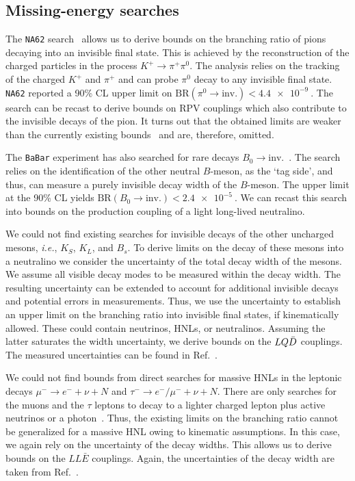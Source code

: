 \medskip


\medskip

\subsection{Missing-energy searches}

The \texttt{NA62} search~\cite{NA62:2020pwi} allows us to derive bounds on the branching ratio of pions 
decaying into an invisible final state. This is achieved by the reconstruction of the charged particles 
in the process $K^+ \to \pi^+ \pi^0$. The analysis relies on the tracking of the charged $K^+$ and $\pi
^+$ and can probe $\pi^0$ decay to any invisible final state. \texttt{NA62} 
reported a 90\% CL upper limit on $\text{BR}(\pi^0 \to \text{inv.}) < \SI{4.4e-9}
{}$. The search can be recast to derive bounds on RPV couplings which also contribute to the invisible 
decays of the pion. It turns out that the obtained limits are weaker than the currently existing bounds~\cite{Allanach:1999ic, Dercks:2017lfq} and are, therefore, omitted.

The \texttt{BaBar} experiment has also searched for rare decays $B_0 \to \text{inv.}$~\cite{BaBar:2012yut}.
The search relies on the identification of the other neutral $B$-meson, as the ‘tag side’, and thus, can 
measure a purely invisible decay width of the $B$-meson.
The upper limit at the 90\% CL yields $\text{BR}(B_0 \to \text{inv.}) < \SI{2.4e-5}{}$.
We can recast this search into bounds on the production coupling of a light long-lived neutralino.

We could not find existing searches for invisible decays of the other uncharged 
mesons, \textit{i.e.}, $K_S$, $K_L$, and $B_s$. To derive limits on the decay of these mesons into a 
neutralino we consider the uncertainty of the total decay width of the mesons. We assume all visible 
decay modes to be measured within the decay width. The resulting 
uncertainty can be extended to account for additional invisible decays and potential errors in 
measurements. Thus, we use the uncertainty to establish an upper limit on the branching ratio into 
invisible final states, if kinematically allowed. These could contain 
neutrinos, HNLs, or neutralinos. Assuming the latter saturates the width uncertainty, we derive bounds on 
the $LQ\Bar{D}$ couplings. The measured uncertainties can be found in Ref.~\cite{ParticleDataGroup:2022pth}. 


We could not find bounds from direct searches for massive HNLs in the leptonic 
decays $\mu^-\to e^-+\nu  + N$ and $\tau^- \to e^-/\mu^-+ \nu + N$. There are only searches for the muons 
and the $\tau$ leptons to decay to a lighter charged lepton plus active neutrinos or a 
photon~\cite{MEG:2016leq}. Thus, the existing limits on the branching ratio cannot be generalized for a 
massive HNL owing to kinematic assumptions. In this case, we again rely on the uncertainty of the decay widths. This allows us to derive bounds on the $LL
\bar{E}$ couplings. Again, the uncertainties of the decay width are taken from 
Ref.~\cite{ParticleDataGroup:2022pth}.


